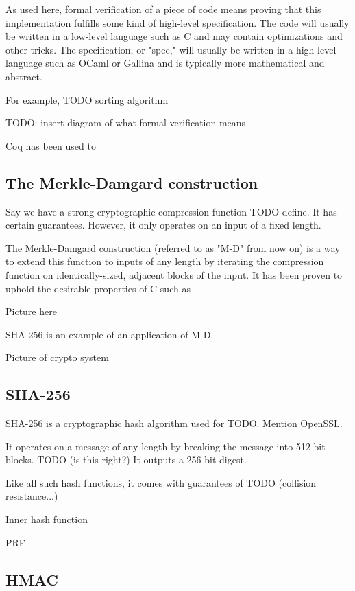 \documentclass[twocolumn,showpacs,%
  nofootinbib,aps,superscriptaddress,%
  eqsecnum,prd,notitlepage,showkeys,10pt]{revtex4-1}
\begin{document}
As used here, formal verification of a piece of code means proving that this implementation fulfills some kind of high-level specification. The code will usually be written in a low-level language such as C and may contain optimizations and other tricks. The specification, or "spec," will usually be written in a high-level language such as OCaml or Gallina and is typically more mathematical and abstract.

For example, TODO sorting algorithm

TODO: insert diagram of what formal verification means

Coq has been used to

\subsection{The Merkle-Damgard construction}

Say we have a strong cryptographic compression function TODO define. It has certain guarantees. However, it only operates on an input of a fixed length.

The Merkle-Damgard construction (referred to as "M-D" from now on) is a way to extend this function to inputs of any length by iterating the compression function on identically-sized, adjacent blocks of the input. It has been proven to uphold the desirable properties of C such as

Picture here

SHA-256 is an example of an application of M-D.

Picture of crypto system 

\subsection{SHA-256}

SHA-256 is a cryptographic hash algorithm used for TODO. Mention OpenSSL.

It operates on a message of any length by breaking the message into 512-bit blocks. TODO (is this right?) It outputs a 256-bit digest. 

Like all such hash functions, it comes with guarantees of TODO (collision resistance...)

Inner hash function

PRF

\subsection{HMAC}
\end{document}
